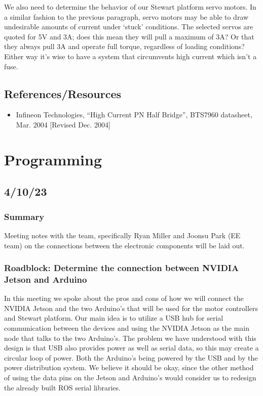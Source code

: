 \documentclass[a4paper, 10pt]{article}
\begin{document}
		We also need to determine the behavior of our Stewart platform servo motors. In a similar fashion to the previous paragraph, servo motors may be able to draw undesirable amounts of current under `stuck' conditions. The selected servos are quoted for 5V and 3A; does this mean they will pull a maximum of 3A? Or that they always pull 3A and operate full torque, regardless of loading conditions? Either way it's wise to have a system that circumvents high current which isn't a fuse.
		
	\subsection{References/Resources}
\begin{itemize}
		\item Infineon Technologies, ``High Current PN Half Bridge'', BTS7960 datasheet, Mar. 2004 [Revised Dec. 2004]
	\end{itemize}		
		
		
\section{Programming}
    \subsection{4/10/23}
        \subsubsection{Summary}
        Meeting notes with the team, specifically Ryan Miller and Joonsu Park (EE team) on the connections between the electronic components will be laid out.

        \subsubsection{Roadblock: Determine the connection between NVIDIA Jetson and Arduino}
        In this meeting we spoke about the pros and cons of how we will connect the NVIDIA Jetson and the two Arduino's that will be used for the motor controllers and Stewart platform. Our main idea is to utilize a USB hub for serial communication between the devices and using the NVIDIA Jetson as the main node that talks to the two Arduino's. The problem we have understood with this design is that USB also provides power as well as serial data, so this may create a circular loop of power. Both the Arduino's being powered by the USB and by the power distribution system. We believe it should be okay, since the other method of using the data pins on the Jetson and Arduino's would consider us to redesign the already built ROS serial libraries. 
\end{document}
